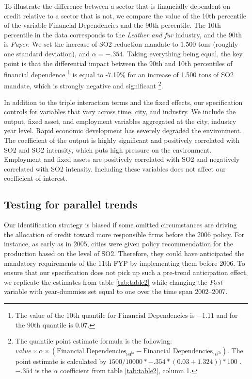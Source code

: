 \documentclass[12pt]{article}
\begin{document}
To illustrate the difference between a sector that is financially dependent on credit relative to a sector that is not, we compare the value of the 10th percentile of the variable $\text{Financial Dependencies}$ and the 90th percentile. The 10th percentile in the data corresponds to the \textit{Leather and fur} industry, and the 90th is \textit{Paper}. We set the increase of SO2 reduction mandate to 1.500 tons (roughly one standard deviation), and $\alpha= -.354$. Taking everything being equal, the key point is that the differential impact between the 90th and 10th percentiles of financial dependence \footnote{The value of the 10th quantile for  $\text{Financial Dependencies}$ is $-1.11$ and for the 90th quantile is 0.07.} is equal to -7.19\% for an increase of 1.500 tons of SO2 mandate, which is strongly negative and significant \footnote{The quantile point estimate formula is the following: $value \times \alpha \times (\text{Financial Dependencies}_{90^{th}} - \text{Financial Dependencies}_{10^{th}})$. The point estimate is calculated by $1500/10000 * -.354 * (0.03 + 1.324 )) * 100$ . $-.354$ is the $\alpha$ coefficient from table \ref{tab:table2}, column 1.}.

In addition to the triple interaction terms and the fixed effects, our specification controls for variables that vary across time, city, and industry. We include the output, fixed asset, and employment variables aggregated at the city, industry year level. Rapid economic development has severely degraded the environment. The coefficient of the output is highly significant and positively correlated with SO2 and SO2 intensity, which puts high pressure on the environment. Employment and fixed assets are positively correlated with SO2 and negatively correlated with SO2 intensity. Including these variables does not affect our coefficient of interest.

\subsection{Testing for parallel trends}

Our identification strategy is biased if some omitted circumstances are driving the allocation of credit toward more responsible firms before the 2006 policy. For instance, as early as in 2005, cities were given policy recommendation for the production based on the level of SO2. Therefore, they could have anticipated the mandatory requirements of the 11th FYP by implementing them before 2006. To ensure that our specification does not pick up such a pre-trend anticipation effect, we replicate the estimates from table \ref{tab:table2} while changing the $Post$ variable with year-dummies set equal to one over the time span 2002–2007.
\end{document}
